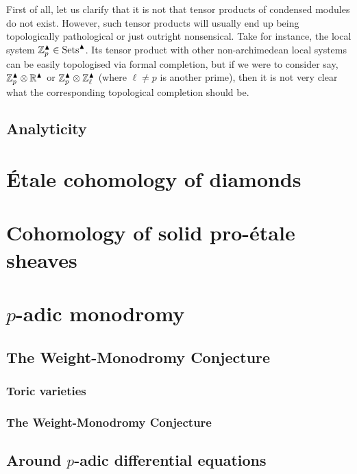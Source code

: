         First of all, let us clarify that it is not that tensor products of condensed modules do not exist. However, such tensor products will usually end up being topologically pathological or just outright nonsensical. Take for instance, the local system $\mathbb{Z}_p^{\blacktriangle} \in \mathrm{Sets}^{\blacktriangle}$. Its tensor product with other non-archimedean local systems can be easily topologised via formal completion, but if we were to consider say, $\Z_p^{\cond} \tensor \R^{\cond}$ or $\Z_p^{\cond} \tensor \Z_{\ell}^{\cond}$ (where $\ell \not = p$ is another prime), then it is not very clear what the corresponding topological completion should be.  
        
    \subsection{Analyticity}

\section{\'Etale cohomology of diamonds}

\section{Cohomology of solid pro-\'etale sheaves}
    
\section{\texorpdfstring{$p$}{}-adic monodromy}
    \subsection{The Weight-Monodromy Conjecture}
        \subsubsection{Toric varieties}
        
        \subsubsection{The Weight-Monodromy Conjecture}
        
    \subsection{Around \texorpdfstring{$p$}{}-adic differential equations}
